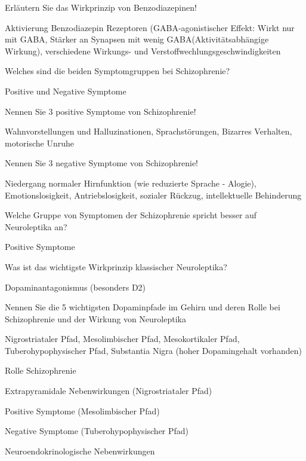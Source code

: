 \documentclass[10pt, a4paper]{exam}
\begin{document}
\begin{questions}
  \question Erläutern Sie das Wirkprinzip von Benzodiazepinen!
  \begin{solution}
    Aktivierung Benzodiazepin Rezeptoren (GABA-agonistischer Effekt: Wirkt nur mit GABA,
    Stärker an Synapsen mit wenig GABA(Aktivitätsabhängige Wirkung), verschiedene Wirkungs- und Verstoffwechlungsgeschwindigkeiten
  \end{solution}

  \question Welches sind die beiden Symptomgruppen bei Schizophrenie?
  \begin{solution}
    Positive und Negative Symptome
  \end{solution}

  \question Nennen Sie 3 positive Symptome von Schizophrenie!
  \begin{solution}
    Wahnvorstellungen und Halluzinationen, Sprachstörungen, Bizarres Verhalten, motorische Unruhe
  \end{solution}

  \question Nennen Sie 3 negative Symptome von Schizophrenie!
  \begin{solution}
    Niedergang normaler Hirnfunktion (wie reduzierte Sprache - Alogie), Emotionslosigkeit, Antriebslosigkeit, sozialer Rückzug, intellektuelle Behinderung
  \end{solution}

  \question Welche Gruppe von Symptomen der Schizophrenie spricht besser auf Neuroleptika an?
  \begin{solution}
    Positive Symptome
  \end{solution}

  \question Was ist das wichtigste Wirkprinzip klassischer Neuroleptika?
  \begin{solution}
    Dopaminantagonismus (besonders D2)
  \end{solution}

  \question Nennen Sie die 5 wichtigsten Dopaminpfade im Gehirn und deren Rolle bei Schizophrenie und der Wirkung von Neuroleptika
  \begin{solution}
    Nigrostriataler Pfad,
    Mesolimbischer Pfad,
    Mesokortikaler Pfad,
    Tuberohypophysischer Pfad,
    Substantia Nigra (hoher Dopamingehalt vorhanden)

    Rolle Schizophrenie
    \begin{itemize*}
      \item Extrapyramidale Nebenwirkungen (Nigrostriataler Pfad)
      \item Positive Symptome (Mesolimbischer Pfad)
      \item Negative Symptome (Tuberohypophysischer Pfad)
      \item Neuroendokrinologische Nebenwirkungen
    \end{itemize*}


\end{solution}
\end{questions}
\end{document}
